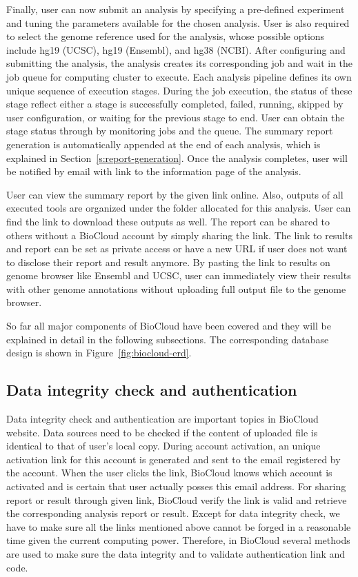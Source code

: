 Finally, user can now submit an analysis by specifying a pre-defined experiment
and tuning the parameters available for the chosen analysis. User is also
required to select the genome reference used for the analysis, whose possible
options include hg19 (UCSC), hg19 (Ensembl), and hg38 (NCBI). After configuring
and submitting the analysis, the analysis creates its corresponding job and
wait in the job queue for computing cluster to execute. Each analysis pipeline
defines its own unique sequence of execution stages. During the job execution,
the status of these stage reflect either a stage is successfully completed,
failed, running, skipped by user configuration, or waiting for the previous
stage to end. User can obtain the stage status through by monitoring jobs and
the queue. The summary report generation is automatically appended at the end
of each analysis, which is explained in Section~\ref{s:report-generation}. Once
the analysis completes, user will be notified by email with link to the
information page of the analysis.

User can view the summary report by the given link online. Also, outputs of all
executed tools are organized under the folder allocated for this analysis. User
can find the link to download these outputs as well. The report can be shared
to others without a BioCloud account by simply sharing the link. The link to
results and report can be set as private access or have a new URL if user does
not want to disclose their report and result anymore. By pasting the link to
results on genome browser like Ensembl and UCSC, user can immediately view
their results with other genome annotations without uploading full output file
to the genome browser.



So far all major components of BioCloud have been covered and they will be
explained in detail in the following subsections. The corresponding database
design is shown in Figure~\ref{fig:biocloud-erd}.


\subsection{Data integrity check and authentication}

Data integrity check and authentication are important topics in BioCloud
website. Data sources need to be checked if the content of uploaded file is
identical to that of user's local copy. During account activation, an unique
activation link for this account is generated and sent to the email registered
by the account. When the user clicks the link, BioCloud knows which account is
activated and is certain that user actually posses this email address. For
sharing report or result through given link, BioCloud verify the link is valid
and retrieve the corresponding analysis report or result. Except for data
integrity check, we have to make sure all the links mentioned above cannot be
forged in a reasonable time given the current computing power. Therefore, in
BioCloud several methods are used to make sure the data integrity and to
validate authentication link and code.

